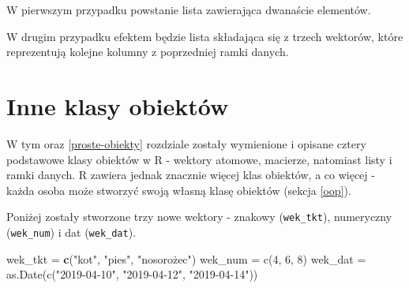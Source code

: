 \documentclass[paper=6in:9in,pagesize=pdftex,headinclude=on,footinclude=on,10pt]{scrbook}
\newenvironment{Shaded}{\begin{snugshade}}{\end{snugshade}}
\newcommand{\CommentTok}[1]{\textcolor[rgb]{0.56,0.35,0.01}{\textit{#1}}}
\newcommand{\DecValTok}[1]{\textcolor[rgb]{0.00,0.00,0.81}{#1}}
\newcommand{\KeywordTok}[1]{\textcolor[rgb]{0.13,0.29,0.53}{\textbf{#1}}}
\newcommand{\NormalTok}[1]{#1}
\newcommand{\StringTok}[1]{\textcolor[rgb]{0.31,0.60,0.02}{#1}}
\begin{document}
W pierwszym przypadku powstanie lista zawierająca dwanaście elementów.

\begin{Shaded}
\end{Shaded}

W drugim przypadku efektem będzie lista składająca się z trzech wektorów, które reprezentują kolejne kolumny z poprzedniej ramki danych.

\begin{Shaded}
\end{Shaded}

\hypertarget{inne-klasy}{%
\section{Inne klasy obiektów}\label{inne-klasy}}

W tym oraz \ref{proste-obiekty} rozdziale zostały wymienione i opisane cztery podstawowe klasy obiektów w R - wektory atomowe, macierze, natomiast listy i ramki danych.
R zawiera jednak znacznie więcej klas obiektów, a co więcej - każda osoba może stworzyć swoją własną klasę obiektów (sekcja \ref{oop}).

Poniżej zostały stworzone trzy nowe wektory - znakowy (\texttt{wek\_tkt}), numeryczny (\texttt{wek\_num}) i dat (\texttt{wek\_dat}).

\begin{Shaded}
\begin{Highlighting}[]
\NormalTok{wek_tkt =}\StringTok{ }\KeywordTok{c}\NormalTok{(}\StringTok{"kot"}\NormalTok{, }\StringTok{"pies"}\NormalTok{, }\StringTok{"nosorożec")}
\StringTok{wek_num = c(4, 6, 8)}
\StringTok{wek_dat = as.Date(c("}\DecValTok{2019-04-10}\StringTok{", "}\DecValTok{2019-04-12}\StringTok{", "}\DecValTok{2019-04-14}\StringTok{"))}
\end{Highlighting}
\end{Shaded}
\end{document}
